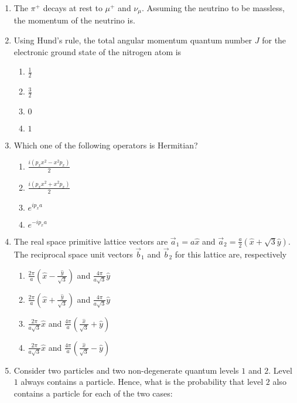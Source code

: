 \documentclass{article}
\newcommand{\brak}[1]{\left( #1 \right)}
\begin{document}
\begin{enumerate}
\item The $\pi^+$ decays at rest to $\mu^+$ and $\nu_{\mu}$. Assuming the neutrino to be massless, the momentum of the neutrino is. 

\item Using Hund's rule, the total angular momentum quantum number $J$ for the electronic ground state of the nitrogen atom is

\begin{enumerate}
    \item $\frac{1}{2}$
    \item $\frac{3}{2}$
    \item $0$
    \item $1$
\end{enumerate}

\item Which one of the following operators is Hermitian?

\begin{enumerate}
    \item $\frac{i(p_x x^2 - x^2 p_x)}{2}$
    \item $\frac{i(p_x x^2 + x^2 p_x)}{2}$
    \item $e^{ip_x a}$
    \item $e^{-ip_x a}$
\end{enumerate}

\item The real space primitive lattice vectors are $\vec{a}_1 = a\hat{x}$ and $\vec{a}_2 = \frac{a}{2}\brak{\hat{x} + \sqrt{3}\hat{y}}$. The reciprocal space unit vectors $\vec{b}_1$ and $\vec{b}_2$ for this lattice are, respectively  

\begin{enumerate}
    \item $\frac{2\pi}{a}\brak{\hat{x} - \frac{\hat{y}}{\sqrt{3}}}$ and $\frac{4\pi}{a\sqrt{3}}\hat{y}$
    \item $\frac{2\pi}{a}\brak{\hat{x} + \frac{\hat{y}}{\sqrt{3}}}$ and $\frac{4\pi}{a\sqrt{3}}\hat{y}$
    \item $\frac{2\pi}{a\sqrt{3}}\hat{x}$ and $\frac{4\pi}{a}\brak{\frac{\hat{x}}{\sqrt{3}} + \hat{y}}$
    \item $\frac{2\pi}{a\sqrt{3}}\hat{x}$ and $\frac{4\pi}{a}\brak{\frac{\hat{x}}{\sqrt{3}} - \hat{y}}$
\end{enumerate}

\item Consider two particles and two non-degenerate quantum levels $1$ and $2$. Level $1$ always contains a particle. Hence, what is the probability that level $2$ also contains a particle for each of the two cases:


\end{enumerate}
\end{document}
